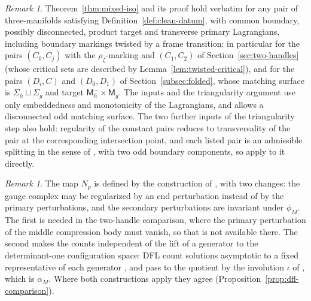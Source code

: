 \documentclass[11pt]{amsart}
\theoremstyle{definition}
\theoremstyle{remark}
\newtheorem{remark}[theorem]{Remark}
\theoremstyle{plain}
\numberwithin{equation}{section}
\newcommand{\Msf}{\mathsf{M}}
\begin{document}
\begin{remark}\label{rem:clean-pairs}
Theorem~\ref{thm:mixed-iso} and its proof hold verbatim for any pair of
three-manifolds satisfying Definition~\ref{def:clean-datum}, with common boundary,
possibly disconnected, product target and transverse primary Lagrangians,
including boundary markings twisted by a frame transition: in particular for
the pairs $(C_0,C_j)$ with the $\rho_\zeta$-marking and $(C_1,C_2)$ of
Section~\ref{sec:two-handles} (whose critical sets are described by
Lemma~\ref{lem:twisted-critical}), and for the pairs $(D_i,C)$ and $(D_0,D_1)$
of Section~\ref{subsec:folded}, whose matching surface is
$\Sigma_h\sqcup\Sigma_g$ and target $\Msf_h^-\times\Msf_g$. The inputs
\cite[Lemma~3.15, Proposition~3.20]{DFL} and the triangularity argument use
only embeddedness and monotonicity of the Lagrangians, and
\cite{DFL-mixed} allows a disconnected odd matching surface. The two further
inputs of the triangularity step also hold: regularity of the constant pairs
\cite[Proposition~3.19]{DFL} reduces to transversality of the pair at the
corresponding intersection point, and each listed pair is an admissible
splitting in the sense of \cite{DFL}, with two odd boundary components, so
\cite[Propositions~2.53 and~3.20]{DFL} apply to it directly.
\end{remark}

\begin{remark}\label{rem:dfl-map}
The map $N_p$ is defined by the construction of \cite[Section~3.2]{DFL}, with two
changes: the gauge complex may be regularized by an end perturbation instead of by
the primary perturbations, and the secondary perturbations are invariant under
$\phi_M$. The first is needed in the two-handle comparison, where the primary
perturbation of the middle compression body must vanish, so that
\cite[Lemma~2.56]{DFL} is not available there. The second makes the counts
independent of the lift of a generator to the determinant-one configuration space:
DFL count solutions asymptotic to a fixed representative of each generator
\cite[p.~27]{DFL}, and pass to the quotient by the involution $\iota$ of
\cite[p.~18]{DFL}, which is $\alpha_M$. Where both constructions apply they agree
(Proposition~\ref{prop:dfl-comparison}).
\end{remark}
\end{document}
